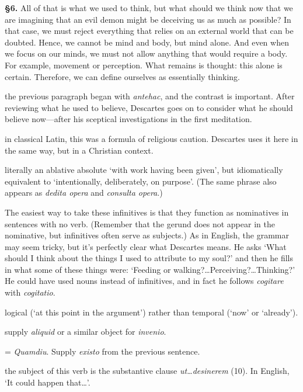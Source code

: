 \prenotes

\textbf{§6.} All of that is what we used to think, but what should we think now that we are imagining that an evil demon might be deceiving us as much as possible? In that case, we must reject everything that relies on an external world that can be doubted. Hence, we cannot be mind and body, but mind alone. And even when we focus on our minds, we must not allow anything that would require a body. For example, movement or perception. What remains is thought: this alone is certain. Therefore, we can define ourselves as essentially thinking.

 the previous paragraph began with \textit{antehac}, and the contrast is important. After reviewing what he used to believe, Descartes goes on to consider what he should believe now---after his sceptical investigations in the first meditation.

 in classical Latin, this was a formula of religious caution. Descartes uses it here in the same way, but in a Christian context.

 literally an ablative absolute `with work having been given', but idiomatically equivalent to `intentionally, deliberately, on purpose'. (The same phrase also appears as \textit{dedita opera} and \textit{consulta opera}.)

 The easiest way to take these infinitives is that they function as nominatives in sentences with no verb. (Remember that the gerund does not appear in the nominative, but infinitives often serve as subjects.) As in English, the grammar may seem tricky, but it's perfectly clear what Descartes means. He asks `What should I think about the things I used to attribute to my soul?' and then he fills in what some of these things were: `Feeding or walking?\dots Perceiving?\dots Thinking?' He could have used nouns instead of infinitives, and in fact he follows \textit{cogitare} with \textit{cogitatio}.

 logical (`at this point in the argument') rather than temporal (`now' or `already').

 supply \textit{aliquid} or a similar object for \textit{invenio}.

 = \textit{Quamdiu}. Supply \textit{existo} from the previous sentence.

 the subject of this verb is the substantive clause \textit{ut\dots desinerem} (10). In English, `It could happen that\dots'.

